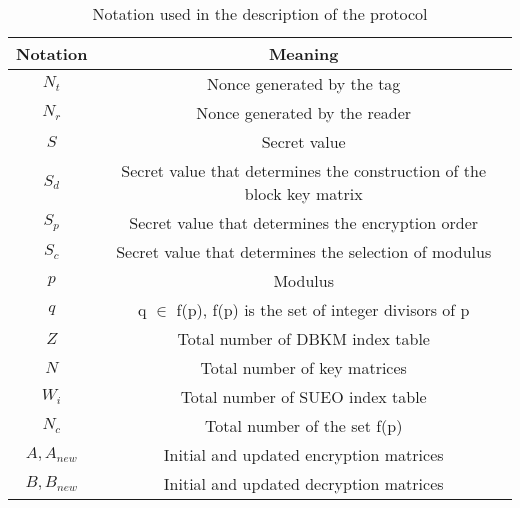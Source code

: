 \begin{table}[H]
    \centering
    \caption{Notation used in the description of the protocol}
    \begin{tabular}{cc}
        \hline
        Notation & Meaning \\
        \hline
        $N_t$ & Nonce generated by the tag \\
        $N_r$ & Nonce generated by the reader \\
        $S$ & Secret value \\
        $S_d$ & Secret value that determines the construction of the block key matrix  \\
        $S_p$ & Secret value that determines the encryption order  \\
        $S_c$ & Secret value that determines the selection of modulus  \\
        $p$ & Modulus  \\
        $q$ & q $\in$ f(p), f(p) is the set of integer divisors of p \\
        $Z$ &  Total number of DBKM index table \\
        $N$ &  Total number of key matrices \\
        $W_i$ & Total number of SUEO index table  \\
        $N_c$ & Total number of the set f(p)  \\
        $A, A_{new}$ & Initial and updated encryption matrices \\
        $B, B_{new}$ & Initial and updated decryption matrices \\
        \hline
    \end{tabular}
\end{table}

